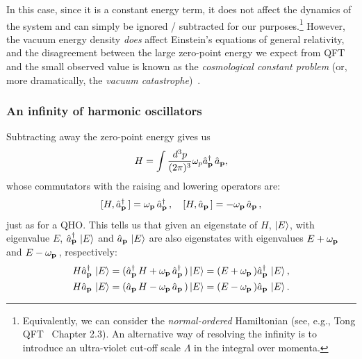 In this case, since it is a constant energy term, it does not affect the dynamics of the system and can simply be ignored / subtracted for our purposes.\footnote{Equivalently, we can consider the \textit{normal-ordered} Hamiltonian (see, e.g., Tong QFT~\cite{TongQFT} Chapter 2.3).
An alternative way of resolving the infinity is to introduce an ultra-violet cut-off scale $\Lambda$ in the integral over momenta.}
However, the vacuum energy density \textit{does} affect Einstein's equations of general relativity, and the disagreement between the large zero-point energy we expect from QFT and the small observed value is known as the \textit{cosmological constant problem} (or, more dramatically, the \textit{vacuum catastrophe})~\cite{Adler:1995vd, Bengochea:2019daa}.

\subsubsection{An infinity of harmonic oscillators}

Subtracting away the zero-point energy gives us
\begin{equation}
    \label{eq:01_qft_quantization_hamiltonian}
    H = \int \frac{d^3p}{(2\pi)^3} \omega_p \hat a^\dagger_{\mathbf{p}}\,\hat a_{\mathbf{p}},
\end{equation}
whose commutators with the raising and lowering operators are:
\begin{equation}
    \label{eq:01_qft_quantization_hamiltonian_commutators}
    [H, \hat a^\dagger_{\mathbf{p}}\,] = \omega_{\mathbf{p}}\, \hat a^\dagger_{\mathbf{p}}\,, \quad [H, \hat a_{\mathbf{p}}\,] = -\omega_{\mathbf{p}}\, \hat a_{\mathbf{p}}\,, 
\end{equation}
just as for a QHO.
This tells us that given an eigenstate of $H$, $\ket{E}$, with eigenvalue $E$, $\hat a^\dagger_{\mathbf{p}}\, \ket{E}$ and $\hat a_{\mathbf{p}}\, \ket{E}$ are also eigenstates with eigenvalues $E + \omega_{\mathbf{p}}\,$ and $E - \omega_{\mathbf{p}}\,$, respectively:
\begin{equation}
    \label{eq:01_qft_quantization_hamiltonian_eigenstates}
    \begin{split}
        H\hat a^\dagger_{\mathbf{p}}\, \ket{E} &= (\hat a^\dagger_{\mathbf{p}}\, H + \omega_{\mathbf{p}}\, \hat a^\dagger_{\mathbf{p}}\,) \ket{E} = (E + \omega_{\mathbf{p}}\,) \hat a^\dagger_{\mathbf{p}}\, \ket{E}, \\
        H\hat a_{\mathbf{p}}\, \ket{E} &= (\hat a_{\mathbf{p}}\, H - \omega_{\mathbf{p}}\, \hat a_{\mathbf{p}}\,) \ket{E} = (E - \omega_{\mathbf{p}}\,) \hat a_{\mathbf{p}}\, \ket{E}.
    \end{split}
\end{equation}

